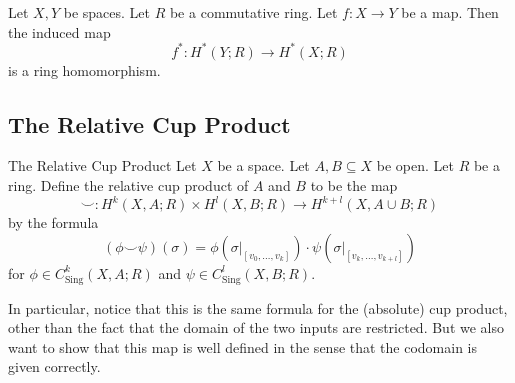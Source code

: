 \documentclass[a4paper]{article}
\begin{document}
\begin{lmm}{}{} Let $X,Y$ be spaces. Let $R$ be a commutative ring. Let $f:X\to Y$ be a map. Then the induced map $$f^\ast:H^\ast(Y;R)\to H^\ast(X;R)$$ is a ring homomorphism. 
\end{lmm}

\subsection{The Relative Cup Product}
\begin{defn}{The Relative Cup Product}{} Let $X$ be a space. Let $A,B\subseteq X$ be open. Let $R$ be a ring. Define the relative cup product of $A$ and $B$ to be the map $$\smile:H^k(X,A;R)\times H^l(X,B;R)\to H^{k+l}(X,A\cup B;R)$$ by the formula $$(\phi\smile\psi)(\sigma)=\phi(\sigma|_{[v_0,\dots,v_k]})\cdot\psi(\sigma|_{[v_k,\dots,v_{k+l}]})$$ for $\phi\in C_\text{Sing}^k(X,A;R)$ and $\psi\in C_\text{Sing}^l(X,B;R)$. 
\end{defn}

In particular, notice that this is the same formula for the (absolute) cup product, other than the fact that the domain of the two inputs are restricted. But we also want to show that this map is well defined in the sense that the codomain is given correctly. 
\end{document}
